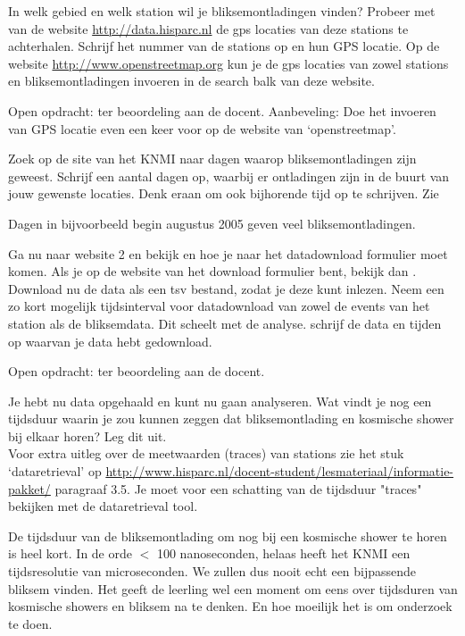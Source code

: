 \begin{questions}
\question
In welk gebied en welk station wil je bliksemontladingen vinden? Probeer met
van de website \url{http://data.hisparc.nl} de gps locaties van deze stations te
achterhalen. Schrijf het nummer van de stations op en hun GPS locatie.
Op de website \url{http://www.openstreetmap.org} kun je de gps locaties van zowel
stations en bliksemontladingen invoeren in de search balk van deze website.
\begin{solution}
    Open opdracht: ter beoordeling aan de docent. Aanbeveling: Doe het invoeren van GPS locatie
    even een keer voor op de website van `openstreetmap'.
\end{solution}

\question
Zoek op de site van het KNMI naar dagen waarop bliksemontladingen zijn geweest.
Schrijf een aantal dagen op, waarbij er ontladingen zijn in de buurt van jouw gewenste
locaties. Denk eraan om ook bijhorende tijd op te schrijven. Zie 
\begin{solution}
    Dagen in bijvoorbeeld begin augustus 2005 geven veel bliksemontladingen.
\end{solution}

\question
Ga nu naar website 2 en bekijk  en 
hoe je naar het datadownload formulier moet komen.
Als je op de website van het download formulier bent, bekijk dan .
Download nu de data als een tsv bestand, zodat je deze kunt inlezen. Neem een zo kort mogelijk tijdsinterval
voor datadownload van zowel de events van het \hisparc station als de bliksemdata.
Dit scheelt met de analyse. schrijf de data en tijden op waarvan je data hebt gedownload.
\begin{solution}
    Open opdracht: ter beoordeling aan de docent.
\end{solution}

\question
Je hebt nu data opgehaald en kunt nu gaan analyseren.
Wat vindt je nog een tijdsduur waarin je zou kunnen zeggen dat bliksemontlading
en kosmische shower bij elkaar horen? Leg dit uit. \\
\small{Voor extra uitleg over de meetwaarden (traces) van \hisparc stations zie het stuk `dataretrieval'
op \url{ http://www.hisparc.nl/docent-student/lesmateriaal/informatie-pakket/} paragraaf 3.5.
Je moet voor een schatting van de tijdsduur "traces" bekijken met de dataretrieval tool.}
\begin{solution}
    De tijdsduur van de bliksemontlading om nog bij een kosmische shower te horen
    is heel kort. In de orde $<$ 100 nanoseconden, helaas heeft het KNMI een tijdsresolutie
    van microseconden. We zullen dus nooit echt een bijpassende bliksem vinden.
    Het geeft de leerling wel een moment om eens over tijdsduren van kosmische showers en bliksem
    na te denken. En hoe moeilijk het is om onderzoek te doen.
\end{solution}


\end{questions}
